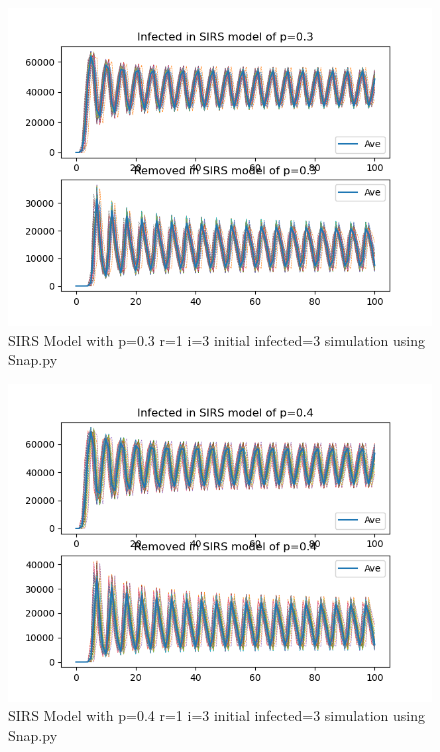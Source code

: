 \documentclass{subfile}
\begin{document}
  \begin{figure}
  \includegraphics[scale=0.8]{sirsp03r1i3s3}
  \caption[SIRS p=0.3,r=1,i=3,init infected=3]{SIRS Model with p=0.3 r=1 i=3 initial infected=3 simulation using Snap.py}
  \end{figure}
  \begin{figure}
  \includegraphics[scale=0.8]{sirsp04r1i3s3}
  \caption[SIRS p=0.4,r=1,i=3,init infected=3]{SIRS Model with p=0.4 r=1 i=3 initial infected=3 simulation using Snap.py}
  \end{figure}
\end{document}
